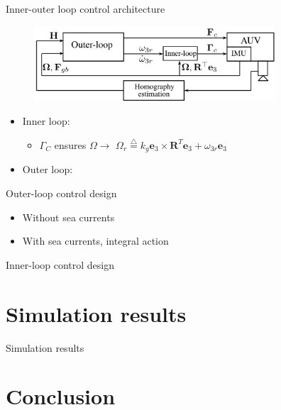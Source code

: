 \documentclass{beamer}
\begin{document}
\begin{frame}{Inner-outer loop control architecture}
\begin{figure}
	\includegraphics[width = 90mm]{Images/Block_diagram_2.png}
\end{figure}


\begin{itemize}
	\item Inner loop:
	\begin{itemize}
	
		\item $\Gamma_C$ ensures  $ \Omega \longrightarrow $ $ \Omega_r \stackrel{\triangle}{=}  k_g \mathbf{e}_3 \times \mathbf{R}^{T} \mathbf{e}_3 + \omega_{3r} \mathbf{e}_3$ 
	\end{itemize} 
	\item Outer loop:
\end{itemize}
\end{frame}

\begin{frame}{Outer-loop control design}
\begin{itemize}
	\item Without sea currents
	
	\item With sea currents, integral action
\end{itemize}

\end{frame}

\begin{frame}{Inner-loop control design}
\end{frame}

\section{Simulation results}
\begin{frame}{Simulation results}
\end{frame}



\section{Conclusion}
\end{document}
